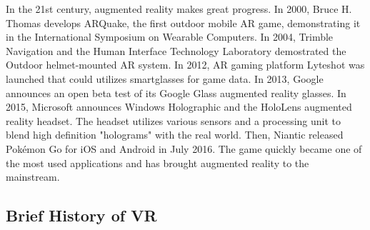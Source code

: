 \documentclass[preprint,12pt]{elsarticle}
\begin{document}
In the 21st century, augmented reality makes great progress. In 2000, Bruce H. Thomas develops ARQuake, the first outdoor mobile AR game, demonstrating it in the International Symposium on Wearable Computers. In 2004, Trimble Navigation and the Human Interface Technology Laboratory demostrated the Outdoor helmet-mounted AR system. In 2012, AR gaming platform Lyteshot was launched that could utilizes smartglasses for game data. In 2013, Google announces an open beta test of its Google Glass augmented reality glasses. In 2015, Microsoft announces Windows Holographic and the HoloLens augmented reality headset. The headset utilizes various sensors and a processing unit to blend high definition "holograms" with the real world. Then, Niantic released Pokémon Go for iOS and Android in July 2016. The game quickly became one of the most used applications and has brought augmented reality to the mainstream.\cite{schepercenter}


\subsection{Brief History of VR}
\end{document}
